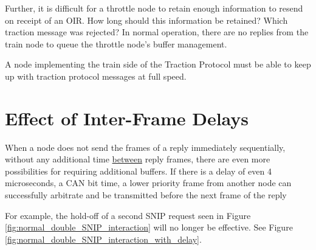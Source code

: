 \documentclass[11pt]{article}
\begin{document}
Further, it is difficult for a throttle node to retain enough
information to resend on receipt of an OIR. How long 
should this information be retained? Which traction message
was rejected? In normal operation, there are no replies from 
the train node to queue the throttle node's buffer management.

A node implementing the train side of the Traction Protocol 
must be able to keep up with traction protocol messages
at full speed.

\cbend

\clearpage
\section{Effect of Inter-Frame Delays}

When a node does not send the frames of a reply immediately sequentially,
without any additional time \underline{between} reply frames, 
there are even more possibilities for requiring additional
buffers.  If there is a delay of even 4 microseconds, a CAN bit time, 
a lower priority frame from another node can successfully arbitrate and 
be transmitted before the next frame of the reply

For example, the hold-off of a second SNIP request seen in 
Figure \ref{fig:normal_double_SNIP_interaction}
will no longer be effective. See
Figure \ref{fig:normal_double_SNIP_interaction_with_delay}.
\end{document}
